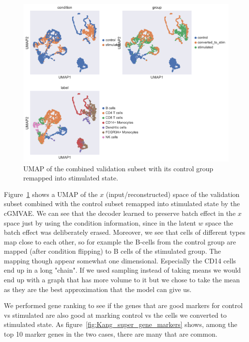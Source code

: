 \documentclass[11pt, a4paper]{report}
\theoremstyle{plain}
\theoremstyle{definition}
\theoremstyle{remark}
\begin{document}
\begin{figure}[h]
\centering
\includegraphics[width=1.1\textwidth]{images/Kang_super_val_umap_converted_control.png}
\caption{
UMAP of the combined validation subset with its control group remapped into
stimulated state.
}
\label{fig:Kang_super_val_umap_converted_control}
\end{figure}

Figure~\ref{fig:Kang_super_val_umap_converted_control} shows a UMAP of the $x$
(input/reconstructed) space of the validation subset combined with the control
subset remapped into stimulated state by the cGMVAE. We can see that the decoder
learned to preserve batch effect in the $x$ space just by using the condition
information, since in the latent $w$ space the batch effect was deliberately
erased. Moreover, we see that cells of different types map close to each other,
so for example the B-cells from the control group are mapped (after condition
flipping) to B cells of the stimulated group.
The mapping though appear somewhat one dimensional. Especially the CD14 cells
end up in a long "chain". If we used sampling instead of taking means we would
end up with a graph that has more volume to it but we chose to take the mean as
they are the best approximation that the model can give us.

We performed gene ranking to see if the genes that are good markers for control
vs stimulated are also good at marking control vs the cells we converted to
stimulated state. As figure~\ref{fig:Kang_super_gene_markers} shows, among the
top 10 marker genes in the two cases, there are many that are common.
\end{document}
